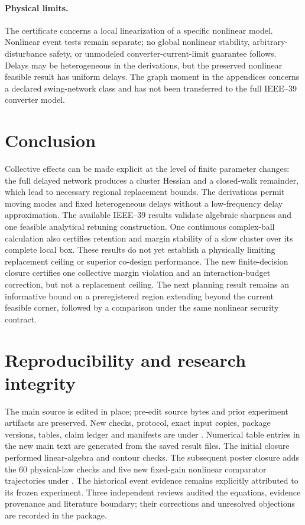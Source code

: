 \documentclass[11pt]{article}
\begin{document}
\paragraph{Physical limits.}
The certificate concerns a local linearization of a specific
nonlinear model. Nonlinear event tests remain separate; no global
nonlinear stability, arbitrary-disturbance safety, or unmodeled
converter-current-limit guarantee follows. Delays may be
heterogeneous in the derivations, but the preserved nonlinear
feasible result has uniform delays. The graph moment in the
appendices concerns a declared swing-network class and has not
been transferred to the full IEEE--39 converter model.

\section{Conclusion}
Collective effects can be made explicit at the level of finite
parameter changes: the full delayed network produces a cluster
Hessian and a closed-walk remainder, which lead to necessary
regional replacement bounds. The derivations permit moving modes
and fixed heterogeneous delays without a low-frequency delay
approximation. The available IEEE--39 results validate algebraic
sharpness and one feasible analytical retuning construction.
One continuous complex-ball calculation also certifies retention and
margin stability of a slow cluster over its complete local box.
These results do not yet establish a physically limiting replacement ceiling
or superior co-design performance. The new finite-decision closure certifies one collective margin violation and an interaction-budget correction, but not a replacement ceiling. The next planning result remains an informative bound on a preregistered region extending beyond the
current feasible corner, followed by a comparison under the same
nonlinear security contract.

\section*{Reproducibility and research integrity}
The main source is edited in place; pre-edit source bytes and prior
experiment artifacts are preserved. New checks, protocol, exact
input copies, package versions, tables, claim ledger and manifests
are under .
Numerical table entries in the new main text are generated from
the saved result files. The initial closure performed linear-algebra
and contour checks. The subsequent poster closure adds the 60 physical-law
checks and five new fixed-gain nonlinear comparator trajectories under
.
The historical event evidence remains explicitly attributed to its
frozen experiment. Three independent reviews audited the equations,
evidence provenance and literature boundary; their corrections and
unresolved objections are recorded in the package.
\end{document}

